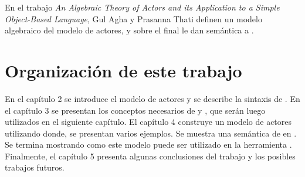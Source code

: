 En el trabajo \textit{An Algebraic Theory of Actors and its Application to a Simple Object-Based Language}\cite{apicalculus}, Gul Agha y Prasanna Thati definen un modelo algebraico del modelo de actores, y sobre el final le dan semántica a \SAL.

\section{Organización de este trabajo}

En el capítulo 2 se introduce el modelo de actores y se describe la sintaxis de \SAL. En el capítulo 3 se presentan los conceptos necesarios de \CSP y \CSPm, que serán luego utilizados en el siguiente capítulo. El capítulo 4 construye un modelo de actores utilizando \CSP donde, se presentan varios ejemplos. Se muestra una semántica de \SAL en \CSP. Se termina mostrando como este modelo puede ser utilizado en la herramienta \FDR. Finalmente, el capítulo 5 presenta algunas conclusiones del trabajo y los posibles trabajos futuros.
